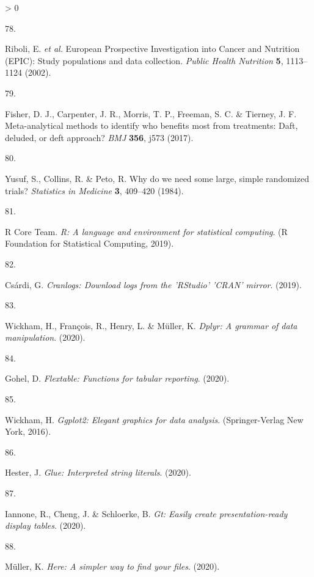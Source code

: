 \documentclass[a4paper, twoside]{templates/ociamthesis}
\newlength{\cslhangindent}
\newlength{\csllabelwidth}
\newenvironment{CSLReferences}[3] %
 {%
  \setlength{\parindent}{0pt}
  \ifodd #1 \everypar{\setlength{\hangindent}{\cslhangindent}}\ignorespaces\fi
  \ifnum #2 > 0
  \setlength{\parskip}{#2\baselineskip}
  \fi
 }%
 {}
\newcommand{\CSLLeftMargin}[1]{\parbox[t]{\maxof{\widthof{#1}}{\csllabelwidth}}{#1}}
\newcommand{\CSLRightInline}[1]{\parbox[t]{\linewidth - \csllabelwidth}{#1}}
\begin{document}
\begin{CSLReferences}{0}{0}
\leavevmode\hypertarget{ref-riboli2002}{}%
\CSLLeftMargin{78. }
\CSLRightInline{Riboli, E. \emph{et al.} European {Prospective Investigation} into {Cancer} and {Nutrition} ({EPIC}): Study populations and data collection. \emph{Public Health Nutrition} \textbf{5}, 1113--1124 (2002).}

\leavevmode\hypertarget{ref-fisher2017}{}%
\CSLLeftMargin{79. }
\CSLRightInline{Fisher, D. J., Carpenter, J. R., Morris, T. P., Freeman, S. C. \& Tierney, J. F. Meta-analytical methods to identify who benefits most from treatments: Daft, deluded, or deft approach? \emph{BMJ} \textbf{356}, j573 (2017).}

\leavevmode\hypertarget{ref-yusuf1984}{}%
\CSLLeftMargin{80. }
\CSLRightInline{Yusuf, S., Collins, R. \& Peto, R. Why do we need some large, simple randomized trials? \emph{Statistics in Medicine} \textbf{3}, 409--420 (1984).}

\leavevmode\hypertarget{ref-base}{}%
\CSLLeftMargin{81. }
\CSLRightInline{R Core Team. \emph{R: {A} language and environment for statistical computing}. ({R Foundation for Statistical Computing}, 2019).}

\leavevmode\hypertarget{ref-cranlogs}{}%
\CSLLeftMargin{82. }
\CSLRightInline{Csárdi, G. \emph{Cranlogs: {Download} logs from the '{RStudio}' '{CRAN}' mirror}. (2019).}

\leavevmode\hypertarget{ref-dplyr}{}%
\CSLLeftMargin{83. }
\CSLRightInline{Wickham, H., François, R., Henry, L. \& Müller, K. \emph{Dplyr: {A} grammar of data manipulation}. (2020).}

\leavevmode\hypertarget{ref-flextable}{}%
\CSLLeftMargin{84. }
\CSLRightInline{Gohel, D. \emph{Flextable: {Functions} for tabular reporting}. (2020).}

\leavevmode\hypertarget{ref-ggplot2}{}%
\CSLLeftMargin{85. }
\CSLRightInline{Wickham, H. \emph{Ggplot2: {Elegant} graphics for data analysis}. ({Springer-Verlag New York}, 2016).}

\leavevmode\hypertarget{ref-glue}{}%
\CSLLeftMargin{86. }
\CSLRightInline{Hester, J. \emph{Glue: {Interpreted} string literals}. (2020).}

\leavevmode\hypertarget{ref-gt}{}%
\CSLLeftMargin{87. }
\CSLRightInline{Iannone, R., Cheng, J. \& Schloerke, B. \emph{Gt: {Easily} create presentation-ready display tables}. (2020).}

\leavevmode\hypertarget{ref-here}{}%
\CSLLeftMargin{88. }
\CSLRightInline{Müller, K. \emph{Here: {A} simpler way to find your files}. (2020).}


\end{CSLReferences}
\end{document}
